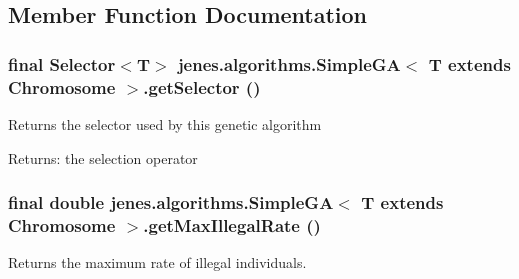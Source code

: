 \subsection{Member Function Documentation}
\hypertarget{classjenes_1_1algorithms_1_1_simple_g_a_3_01_t_01extends_01_chromosome_01_4_c1b67ab65d05c07bd67aa8b072c965d7}{
\subsubsection[getSelector]{\setlength{\rightskip}{0pt plus 5cm}final Selector$<$T$>$ jenes.algorithms.SimpleGA$<$ T extends Chromosome $>$.getSelector ()}}
\label{classjenes_1_1algorithms_1_1_simple_g_a_3_01_t_01extends_01_chromosome_01_4_c1b67ab65d05c07bd67aa8b072c965d7}


Returns the selector used by this genetic algorithm

\begin{Desc}
\item[Returns:]the selection operator \end{Desc}
\hypertarget{classjenes_1_1algorithms_1_1_simple_g_a_3_01_t_01extends_01_chromosome_01_4_6c450c770d9060faf01820a48491561a}{
\subsubsection[getMaxIllegalRate]{\setlength{\rightskip}{0pt plus 5cm}final double jenes.algorithms.SimpleGA$<$ T extends Chromosome $>$.getMaxIllegalRate ()}}
\label{classjenes_1_1algorithms_1_1_simple_g_a_3_01_t_01extends_01_chromosome_01_4_6c450c770d9060faf01820a48491561a}


Returns the maximum rate of illegal individuals.


